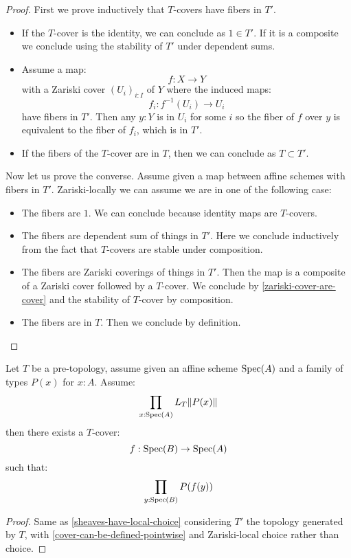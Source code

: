 \begin{proof}
First we prove inductively that $T$-covers have fibers in $T'$. 
\begin{itemize}
\item If the $T$-cover is the identity, we can conclude as $1\in T'$. If it is a composite we conclude using the stability of $T'$ under dependent sums.
\item Assume a map:
\[f:X\to Y\] 
with a Zariski cover $(U_i)_{i:I}$ of $Y$ where the induced maps:
\[f_i:f^{-1}(U_i) \to U_i\]
have fibers in $T'$. Then any $y:Y$ is in $U_i$ for some $i$ so the fiber of $f$ over $y$ is equivalent to the fiber of $f_i$, which is in $T'$.
\item If the fibers of the $T$-cover are in $T$, then we can conclude as $T\subset T'$.
\end{itemize}
Now let us prove the converse. Assume given a map between affine schemes with fibers in $T'$. Zariski-locally we can assume we are in one of the following case:
\begin{itemize}
\item The fibers are $1$. We can conclude because identity maps are $T$-covers.
\item The fibers are dependent sum of things in $T'$. Here we conclude inductively from the fact that  $T$-covers are stable under composition.
\item The fibers are Zariski coverings of things in $T'$. Then the map is a composite of a Zariski cover followed by a $T$-cover. We conclude by \cref{zariski-cover-are-cover} and the stability of $T$-cover by composition. 
\item The fibers are in $T$. Then we conclude by definition.
\end{itemize}
\end{proof}

\begin{lemma}\label{cover-local-choice}
Let $T$ be a pre-topology, assume given an affine scheme $\operatorname{Spec}(A)$ and a family of types $P(x)$ for $x:A$. Assume:
\[\prod_{x:\operatorname{Spec}(A)}L_T\lVert P(x) \rVert\]
then there exists a $T$-cover:
\[f:\operatorname{Spec}(B)\to \operatorname{Spec}(A)\]
such that:
\[\prod_{y:\operatorname{Spec}(B)} P(f(y))\]
\end{lemma}

\begin{proof}
Same as \cref{sheaves-have-local-choice} considering $T'$ the topology generated by $T$, with \cref{cover-can-be-defined-pointwise} and Zariski-local choice rather than choice.
\end{proof}

